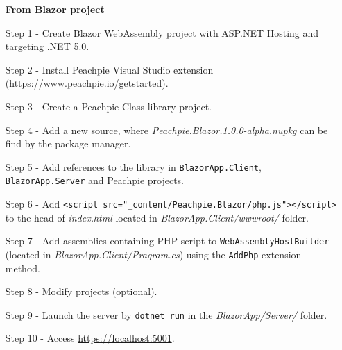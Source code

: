 \par
\begin{itemize}
\item [\textbf{From Blazor project}]
\item [Step 1 -] Create Blazor WebAssembly project with ASP.NET Hosting and targeting .NET 5.0.
\item [Step 2 -]  Install Peachpie Visual Studio extension (\url{https://www.peachpie.io/getstarted}).
\item [Step 3 -] Create a Peachpie Class library project.
\item [Step 4 -] Add a new source, where \textit{Peachpie.Blazor.1.0.0-alpha.nupkg} can be find by the package manager.
\item [Step 5 -] Add references to the library in \texttt{BlazorApp.Client}, \texttt{BlazorApp.Server} and Peachpie projects.
\item [Step 6 -] Add \texttt{<script src="\_content/Peachpie.Blazor/php.js"></script>}\\ to the head of \textit{index.html} located in \textit{BlazorApp.Client/wwwroot/} folder.
\item [Step 7 -] Add assemblies containing PHP script to \texttt{WebAssemblyHostBuilder} (located in \textit{BlazorApp.Client/Pragram.cs}) using the \texttt{AddPhp} extension method.
\item [Step 8 -] Modify projects (optional).
\item [Step 9 -] Launch the server by \texttt{dotnet run} in the \textit{BlazorApp/Server/} folder. 
\item [Step 10 -]  Access \url{https://localhost:5001}.
\end{itemize}
